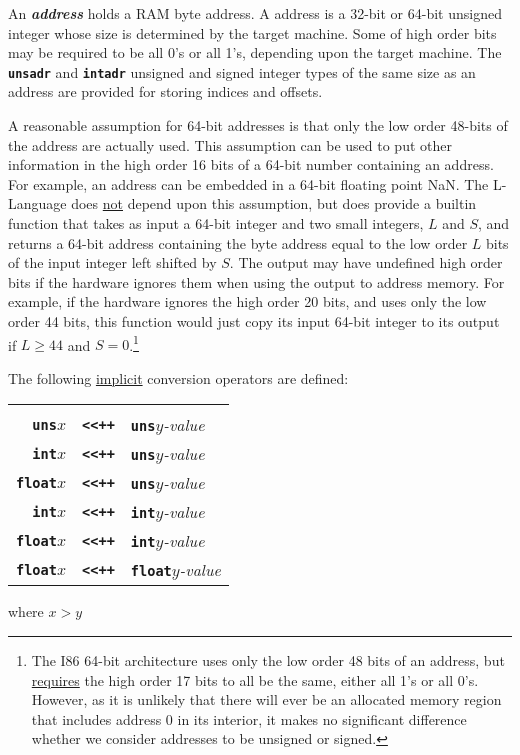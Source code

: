 \documentclass[12pt]{article}
\newcommand{\TT}[1]{{\tt \bfseries #1}}
\newcommand{\key}[1]{{\bf \em #1}\index{#1}}
\begin{document}
An \key{address} holds a RAM byte address.
A address is a 32-bit or 64-bit unsigned integer whose size
is determined by the target machine.  Some of high order bits may be
required to be all 0's or all 1's, depending upon
the target machine.  The \TT{unsadr} and \TT{intadr}
unsigned and signed integer types of the same size
as an address are provided for storing indices and offsets.

A reasonable assumption for 64-bit addresses is that only the low
order 48-bits of the address are actually used.  This assumption can
be used to put other information in the high order 16 bits
of a 64-bit number containing an address.  For example, an address
can be embedded in a 64-bit floating point NaN.  The L-Language does
\underline{not} depend upon this assumption, but does provide a builtin function
that takes as input a 64-bit integer and two small integers, $L$ and $S$,
and returns a 64-bit address containing
the byte address equal to the low order $L$ bits of the input integer
left shifted by $S$.  The output may have undefined high order bits if
the hardware ignores them when using the output to address memory.
For example, if the hardware ignores the high order 20 bits, and uses only the
low order 44 bits,
this function would just copy its input 64-bit integer to its output
if $L\geq 44$ and $S=0$.\footnote{The I86 64-bit architecture
uses only the low order 48 bits of an address, but \underline{requires}
the high order 17 bits to all be the same, either all 1's or all 0's.
However, as it is unlikely that there will ever be an allocated memory region
that includes address 0 in its interior, it makes no significant difference
whether we consider addresses to be unsigned or signed.}

The following \underline{implicit} conversion operators are defined:
\begin{center}

\begin{tabular}{rcl}
\hspace*{2.0in} & & \hspace*{2.0in} \\[-2ex]
\TT{uns}$x$ & \TT{<{}<++} & \TT{uns}$y${\em -value} \\
\TT{int}$x$ & \TT{<{}<++} & \TT{uns}$y${\em -value} \\
\TT{float}$x$ & \TT{<{}<++} & \TT{uns}$y${\em -value} \\
\TT{int}$x$ & \TT{<{}<++} & \TT{int}$y${\em -value} \\
\TT{float}$x$ & \TT{<{}<++} & \TT{int}$y${\em -value} \\
\TT{float}$x$ & \TT{<{}<++} & \TT{float}$y${\em -value} \\
\end{tabular}

where $x>y$

\end{center}
\end{document}
